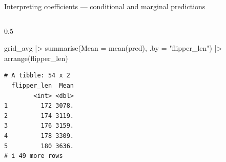 \documentclass[
  10pt,
  ignorenonframetext,
  aspectratio=169,
  t]{beamer}
\newenvironment{Shaded}{\begin{snugshade}}{\end{snugshade}}
\newcommand{\AttributeTok}[1]{\textcolor[rgb]{0.40,0.45,0.13}{#1}}
\newcommand{\FunctionTok}[1]{\textcolor[rgb]{0.28,0.35,0.67}{#1}}
\newcommand{\NormalTok}[1]{\textcolor[rgb]{0.00,0.23,0.31}{#1}}
\newcommand{\SpecialCharTok}[1]{\textcolor[rgb]{0.37,0.37,0.37}{#1}}
\newcommand{\StringTok}[1]{\textcolor[rgb]{0.13,0.47,0.30}{#1}}
\begin{document}
\begin{frame}[fragile]{Interpreting coefficients --- conditional and
marginal predictions}
\begin{columns}[T]
\begin{column}{0.5\linewidth}
\begin{Shaded}
\begin{Highlighting}[]
\NormalTok{grid\_avg }\SpecialCharTok{|\textgreater{}} 
  \FunctionTok{summarise}\NormalTok{(}\AttributeTok{Mean =} \FunctionTok{mean}\NormalTok{(pred), }\AttributeTok{.by =} \StringTok{"flipper\_len"}\NormalTok{) }\SpecialCharTok{|\textgreater{}} 
  \FunctionTok{arrange}\NormalTok{(flipper\_len)}
\end{Highlighting}
\end{Shaded}

\begin{verbatim}
# A tibble: 54 x 2
  flipper_len  Mean
        <int> <dbl>
1         172 3078.
2         174 3119.
3         176 3159.
4         178 3309.
5         180 3636.
# i 49 more rows
\end{verbatim}

\normalsize
\end{column}
\end{columns}
\end{frame}
\end{document}

